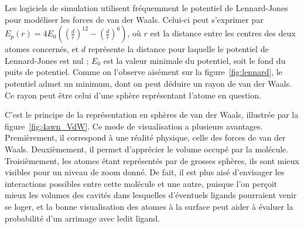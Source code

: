 	
	Les logiciels de simulation utilisent fréquemment le potentiel de Lennard-Jones~\cite{lennard1924determination} pour modéliser les forces de van der Waals. Celui-ci peut s'exprimer par $E_{p}\left(r\right) = 4E_{0} \left( \left(\frac{d}{r}\right)^{12} - \left(\frac{d}{r}\right)^{6} \right)$, où $r$ est la distance entre les centres des deux atomes concernés, et $d$ représente la distance pour laquelle le potentiel de Lennard-Jones est nul ; $E_{0}$ est la valeur minimale du potentiel, soit le \og fond \fg{} du puits de potentiel. Comme on l'observe aisément sur la figure~\ref{fig:lennard}, le potentiel admet un minimum, dont on peut déduire un rayon de van der Waals. Ce rayon peut être celui d'une sphère représentant l'atome en question.%
		
%	
    
	C'est le principe de la représentation en sphères de van der Waals, illustrée par la figure~\ref{fig:4awn_VdW}. Ce mode de visualisation a plusieurs avantages. Premièrement, il correspond à une réalité physique, celle des forces de van der Waals. Deuxièmement, il permet d'apprécier le volume occupé par la molécule. Troisièmement, les atomes étant représentés par de grosses sphères, ils sont mieux visibles pour un niveau de zoom donné. De fait, il est plus aisé d'envisager les interactions possibles entre cette molécule et une autre, puisque l'on perçoit mieux les volumes des cavités dans lesquelles d'éventuels ligands pourraient venir se loger, et la bonne visualisation des atomes à la surface peut aider à évaluer la probabilité d'un arrimage avec ledit ligand.
		
